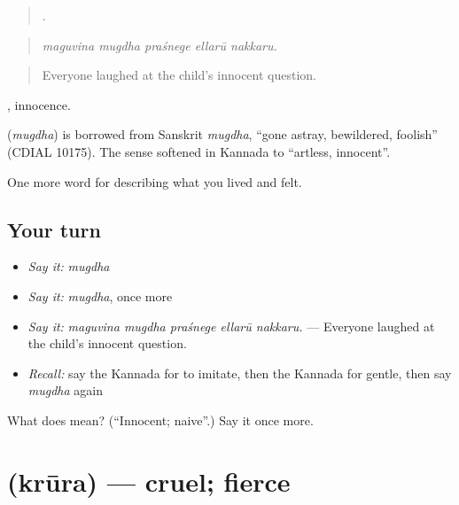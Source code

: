 \begin{quote}
    .
\end{quote}

\begin{quote}
\emph{maguvina mugdha praśnege ellarū nakkaru.}
\end{quote}

\begin{quote}
Everyone laughed at the child's innocent question.
\end{quote}

, innocence.

\begin{cousinweb}
\textbf{} (\emph{mugdha}) is borrowed from Sanskrit \emph{mugdha}, \textquotedblleft{}gone astray, bewildered, foolish\textquotedblright{} (CDIAL 10175). The sense softened in Kannada to \textquotedblleft{}artless, innocent\textquotedblright{}.
\end{cousinweb}

\begin{grammarlens}[title={What you've built}]
One more word for describing what you lived and felt.
\end{grammarlens}

\subsection*{Your turn}
\begin{itemize}
\raggedright
  \item \emph{Say it:} \emph{mugdha}
  \item \emph{Say it:} \emph{mugdha}, once more
  \item \emph{Say it:} \emph{maguvina mugdha praśnege ellarū nakkaru.} — Everyone laughed at the child's innocent question.
  \item \emph{Recall:} say the Kannada for to imitate, then the Kannada for gentle, then say \emph{mugdha} again
\end{itemize}

\begin{tcolorbox}[breakable,colback=teal!4,colframe=teal!35!black,title={Before you move on}]
What does  mean? (\textquotedblleft{}Innocent; naive\textquotedblright{}.) Say it once more.
\end{tcolorbox}
\section[\texorpdfstring{\kn{ಕ್ರೂರ} (krūra)}{ಕ್ರೂರ (krūra)}]{ (krūra) — cruel; fierce}

